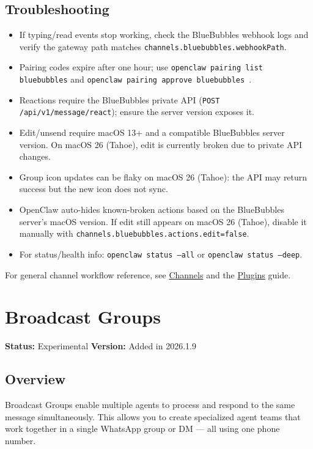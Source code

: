 \subsection{Troubleshooting}


\begin{itemize}
  \item If typing/read events stop working, check the BlueBubbles webhook logs and verify the gateway path matches \texttt{channels.bluebubbles.webhookPath}.
  \item Pairing codes expire after one hour; use \texttt{openclaw pairing list bluebubbles} and \texttt{openclaw pairing approve bluebubbles }.
  \item Reactions require the BlueBubbles private API (\texttt{POST /api/v1/message/react}); ensure the server version exposes it.
  \item Edit/unsend require macOS 13+ and a compatible BlueBubbles server version. On macOS 26 (Tahoe), edit is currently broken due to private API changes.
  \item Group icon updates can be flaky on macOS 26 (Tahoe): the API may return success but the new icon does not sync.
  \item OpenClaw auto-hides known-broken actions based on the BlueBubbles server's macOS version. If edit still appears on macOS 26 (Tahoe), disable it manually with \texttt{channels.bluebubbles.actions.edit=false}.
  \item For status/health info: \texttt{openclaw status --all} or \texttt{openclaw status --deep}.
\end{itemize}


For general channel workflow reference, see \href{/channels}{Channels} and the \href{/tools/plugin}{Plugins} guide.


\clearpage

\section{Broadcast Groups}


\textbf{Status:} Experimental
\textbf{Version:} Added in 2026.1.9

\subsection{Overview}


Broadcast Groups enable multiple agents to process and respond to the same message simultaneously. This allows you to create specialized agent teams that work together in a single WhatsApp group or DM — all using one phone number.

